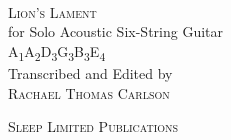 \begin{titlepage}
    \begin{center}
        \vspace*{1.73cm}
        \textsc{}\\[3cm]
        \textsc{\Huge Lion's Lament}\\[.5cm]
        for Solo Acoustic Six-String Guitar\\
        A\textsubscript{1}A\textsubscript{2}D\textsubscript{3}G\textsubscript{3}B\textsubscript{3}E\textsubscript{4}\\[3cm]
        Transcribed and Edited by\\
        \textsc{Rachael Thomas Carlson}\\
        \date{}
        \vfill
        \textsc{Sleep Limited Publications}


    \end{center}

\end{titlepage}

